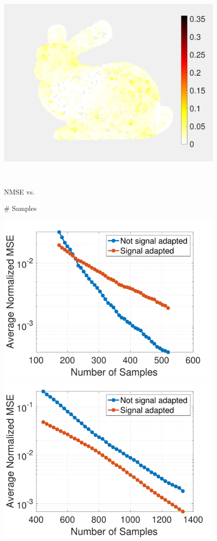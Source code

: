 \documentclass[journal, 10pt]{IEEEtran}
\begin{document}
\begin{figure}[H]
\begin{minipage}[m]{0.4\linewidth}
\end{minipage}
\begin{minipage}[m]{0.4\linewidth}
\centerline{\includegraphics[width=.85\linewidth]{fig_rec_band_error_adapted}}
\end{minipage} \\
\begin{minipage}[m]{0.16\linewidth}
\centerline{\small{NMSE vs.}}
\centerline{\small{\# Samples}}
\end{minipage} 
\begin{minipage}[m]{0.4\linewidth}
\centerline{\includegraphics[width=.85\linewidth]{fig_rec_low_nmse2}}
\end{minipage}
\begin{minipage}[m]{0.4\linewidth}
\centerline{\includegraphics[width=.85\linewidth]{fig_rec_band_nmse2}}

\end{minipage}
\end{figure}
\end{document}
